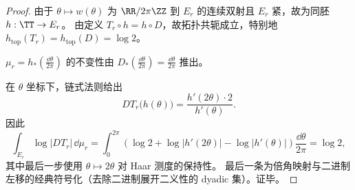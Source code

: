 \begin{proof}
由于 \(\theta\mapsto w(\theta)\) 为 \(\RR/2\pi\ZZ\) 到 \(E_r\) 的连续双射且 \(E_r\) 紧，故为同胚 \(h:\TT\to E_r\)。
由定义 \(T_r\circ h=h\circ D\)，故拓扑共轭成立，特别地 \(h_{\mathrm{top}}(T_r)=h_{\mathrm{top}}(D)=\log 2\)。
\par
\(\mu_r=h_\ast(\frac{\dd\theta}{2\pi})\) 的不变性由
\(
D_\ast(\frac{\dd\theta}{2\pi})=\frac{\dd\theta}{2\pi}
\)
推出。
\par
在 \(\theta\) 坐标下，链式法则给出
\[
DT_r\bigl(h(\theta)\bigr)=\frac{h'(2\theta)\cdot 2}{h'(\theta)}.
\]
因此
\[
\int_{E_r}\log|DT_r|\,\dd\mu_r
=\int_{0}^{2\pi}\left(\log 2+\log|h'(2\theta)|-\log|h'(\theta)|\right)\frac{\dd\theta}{2\pi}
=\log 2,
\]
其中最后一步使用 \(\theta\mapsto 2\theta\) 对 Haar 测度的保持性。
最后一条为倍角映射与二进制左移的经典符号化（去除二进制展开二义性的 dyadic 集）。证毕。
\end{proof}

